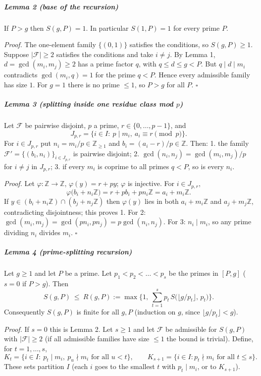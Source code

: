 \subparagraph{Lemma 2 (base of the
recursion)}\label{lemma-2-base-of-the-recursion}

If \(P>g\) then \(S(g,P)=1\). In particular \(S(1,P)=1\) for every prime
\(P\).

\emph{Proof.} The one-element family \(\{(0,1)\}\) satisfies the
conditions, so \(S(g,P)\ge 1\). Suppose \(|\mathcal F|\ge 2\) satisfies
the conditions and take \(i\ne j\). By Lemma 1, \(d=\gcd(m_i,m_j)\ge 2\)
has a prime factor \(q\), with \(q\le d\le g<P\). But
\(q\mid d\mid m_i\) contradicts \(\gcd(m_i,q)=1\) for the prime \(q<P\).
Hence every admissible family has size \(1\). For \(g=1\) there is no
prime \(\le 1\), so \(P>g\) for all \(P\). \(\square\)

\subparagraph{\texorpdfstring{Lemma 3 (splitting inside one residue
class mod
\(p\))}{Lemma 3 (splitting inside one residue class mod p)}}\label{lemma-3-splitting-inside-one-residue-class-mod-p}

Let \(\mathcal F\) be pairwise disjoint, \(p\) a prime,
\(r\in\{0,\dots,p-1\}\), and
\[J_{p,r}=\{i\in I:\ p\mid m_i,\ a_i\equiv r \pmod p\}.\] For
\(i\in J_{p,r}\) put \(n_i=m_i/p\in\mathbb Z_{\ge1}\) and
\(b_i=(a_i-r)/p\in\mathbb Z\). Then: 1. the family
\(\mathcal F'=\{(b_i,n_i)\}_{i\in J_{p,r}}\) is pairwise disjoint; 2.
\(\gcd(n_i,n_j)=\gcd(m_i,m_j)/p\) for \(i\ne j\) in \(J_{p,r}\); 3. if
every \(m_i\) is coprime to all primes \(q<P\), so is every \(n_i\).

\emph{Proof.} Let \(\varphi:\mathbb Z\to\mathbb Z\),
\(\varphi(y)=r+py\); \(\varphi\) is injective. For \(i\in J_{p,r}\),
\[\varphi\big(b_i+n_i\mathbb Z\big)=r+p b_i+p n_i\mathbb Z=a_i+m_i\mathbb Z .\]
If \(y\in (b_i+n_i\mathbb Z)\cap(b_j+n_j\mathbb Z)\) then \(\varphi(y)\)
lies in both \(a_i+m_i\mathbb Z\) and \(a_j+m_j\mathbb Z\),
contradicting disjointness; this proves 1. For 2:
\(\gcd(m_i,m_j)=\gcd(pn_i,pn_j)=p\gcd(n_i,n_j)\). For 3:
\(n_i\mid m_i\), so any prime dividing \(n_i\) divides \(m_i\).
\(\square\)

\subparagraph{Lemma 4 (prime-splitting
recursion)}\label{lemma-4-prime-splitting-recursion}

Let \(g\ge 1\) and let \(P\) be a prime. Let \(p_1<p_2<\dots<p_s\) be
the primes in \([P,g]\) (\(s=0\) if \(P>g\)). Then
\[S(g,P)\ \le\ R(g,P):=\max\Big\{1,\ \sum_{t=1}^{s} p_t\, S\big(\lfloor g/p_t\rfloor,\,p_t\big)\Big\}.\]
Consequently \(S(g,P)\) is finite for all \(g,P\) (induction on \(g\),
since \(\lfloor g/p_t\rfloor<g\)).

\emph{Proof.} If \(s=0\) this is Lemma 2. Let \(s\ge1\) and let
\(\mathcal F\) be admissible for \(S(g,P)\) with \(|\mathcal F|\ge 2\)
(if all admissible families have size \(\le1\) the bound is trivial).
Define, for \(t=1,\dots,s\),
\[K_t=\{i\in I:\ p_t\mid m_i,\ p_u\nmid m_i \text{ for all } u<t\},\qquad K_{s+1}=\{i\in I: p_t\nmid m_i \text{ for all } t\le s\}.\]
These sets partition \(I\) (each \(i\) goes to the smallest \(t\) with
\(p_t\mid m_i\), or to \(K_{s+1}\)).

